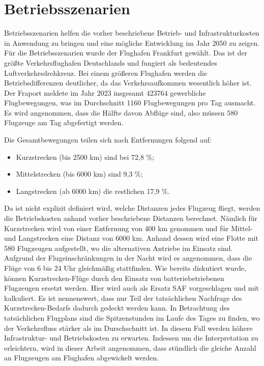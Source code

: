 
\section{Betriebsszenarien}
\label{s:Betriebsszenarien}
Betriebsszenarien helfen die vorher beschriebene Betrieb- und Infrastrukturkosten in Anwendung zu bringen 
und eine mögliche Entwicklung im Jahr 2050 zu zeigen.
Für die Betriebsszenarien wurde der Flughafen Frankfurt gewählt. 
Das ist der größte Verkehrsflughafen Deutschlands und fungiert als bedeutendes Luftverkehrsdrehkreuz. 
Bei einem größeren Flughafen werden die Betriebsdifferenzen deutlicher, da das Verkehrsaufkommen wesentlich höher ist.
Der Fraport meldete im Jahr 2023 insgesamt 423764 gewerbliche Flugbewegungen, was im Durchschnitt 1160 Flugbewegungen pro Tag ausmacht. 
Es wird angenommen, dass die Hälfte davon Abflüge sind, also müssen 580 Flugzeuge am Tag abgefertigt werden.

Die Gesamtbewegungen teilen sich nach Entfernungen folgend auf:
\begin{itemize}
    \item Kurzstrecken (bis 2500 km) sind bei 72,8 \%;
    \item Mittelstrecken (bis 6000 km) sind 9,3 \%;
    \item Langstrecken (ab 6000 km) die restlichen 17,9 \%. 
    \end{itemize}
Da ist nicht explizit definiert wird, welche Distanzen jedes Flugzeug fliegt, werden die Betriebskosten anhand vorher beschriebene Distanzen berechnet.
Nämlich für Kurzstrecken wird von einer Entfernung von 400 km genommen und für Mittel- und Langstrecken eine Distanz von 6000 km.
Anhand dessen wird eine Flotte mit 580 Flugzeugen aufgestellt, wo die alternativen Antriebe im Einsatz sind.
Aufgrund der Flugeinschränkungen in der Nacht wird es angenommen, dass die Flüge von 6 bis 24 Uhr gleichmäßig stattfinden. 
Wie bereits diskutiert wurde, können Kurzstrecken-Flüge durch den Einsatz von batteriebetriebenen Flugzeugen ersetzt werden. Hier wird
auch als Ersatz SAF vorgeschlagen und mit kalkuliert.
Es ist nennenswert, dass nur Teil der tatsächlichen Nachfrage des Kurzstrecken-Bedarfs dadurch gedeckt werden kann. 
In Betrachtung des tatsächlichen Flugplans sind die Spitzenstunden im Laufe des Tages zu finden, wo
der Verkehrsfluss stärker als im Durschschnitt ist. In diesem Fall werden höhere Infrastruktur- und Betriebskosten zu erwarten.
Indessen um die Interpretation zu erleichtern, wird in dieser Arbeit angenommen, dass stündlich die gleiche Anzahl an Flugzeugen 
am Flughafen abgewickelt werden. 


